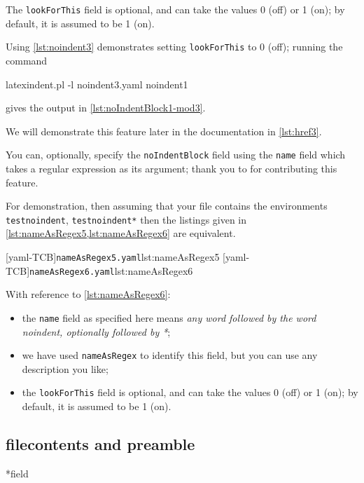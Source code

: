 	The \texttt{lookForThis} field is optional, and can take the values 0 (off) or 1 (on); by
	default, it is assumed to be 1 (on).

	Using \cref{lst:noindent3} demonstrates setting \texttt{lookForThis} to 0 (off); running
	the command
	\begin{commandshell}
latexindent.pl -l noindent3.yaml noindent1
\end{commandshell}
	gives the output in \cref{lst:noIndentBlock1-mod3}.


	We will demonstrate this feature later in the documentation in \cref{lst:href3}.

	You can, optionally, specify  the
	\texttt{noIndentBlock} field using the \texttt{name} field which takes a regular
	expression as its argument; thank you to \cite{XuehaiPan} for contributing this feature.

	For demonstration, then assuming that your file contains the environments
	\texttt{testnoindent}, \texttt{testnoindent*} then the listings given in
	\cref{lst:nameAsRegex5,lst:nameAsRegex6} are equivalent.

	\begin{widepage}
		\begin{cmhtcbraster}[raster column skip=.1\linewidth]
			[yaml-TCB]{\texttt{nameAsRegex5.yaml}}{lst:nameAsRegex5}
			[yaml-TCB]{\texttt{nameAsRegex6.yaml}}{lst:nameAsRegex6}
		\end{cmhtcbraster}
	\end{widepage}

	With reference to \cref{lst:nameAsRegex6}:
	\begin{itemize}
		\item the \texttt{name} field as specified here means \emph{any word followed by the word
		      noindent, optionally followed by *};
		\item we have used \texttt{nameAsRegex} to identify this field, but you can use any description
		      you like;
		\item the \texttt{lookForThis} field is optional, and can take the values 0 (off) or 1 (on); by
		      default, it is assumed to be 1 (on).
	\end{itemize}
\subsection{filecontents and preamble}
*{field}

